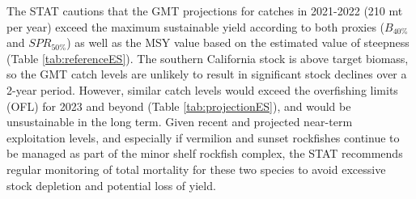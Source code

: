 \documentclass[
  english,
  a4paper,
]{article}
\begin{document}
The STAT cautions that the GMT projections for catches in 2021-2022 (210 mt per year) exceed the maximum sustainable yield according to both proxies (\(B_{40\%}\) and \(SPR_{50\%}\)) as well as the MSY value based on the estimated value of steepness (Table \ref{tab:referenceES}). The southern California stock is above target biomass, so the GMT catch levels are unlikely to result in significant stock declines over a 2-year period. However, similar catch levels would exceed the overfishing limits (OFL) for 2023 and beyond (Table \ref{tab:projectionES}), and would be unsustainable in the long term. Given recent and projected near-term exploitation levels, and especially if vermilion and sunset rockfishes continue to be managed as part of the minor shelf rockfish complex, the STAT recommends regular monitoring of total mortality for these two species to avoid excessive stock depletion and potential loss of yield.
\end{document}
